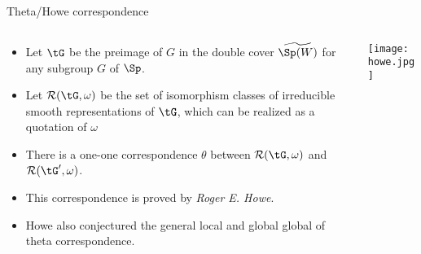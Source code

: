 \documentclass[final,hyperref={pdfpagelabels=false}]{beamer} %
\def\cR{{\mathcal{R}}}
\begin{document}
\begin{frame}
\begin{minipage}[t]{.48\linewidth}
    \begin{block}{Theta/Howe correspondence}
      \begin{columns}
        \begin{column}{0.7\textwidth}
      \begin{itemize}
        \item Let $\tG$ be the preimage of $G$ in the double cover 
          $\widetilde{\Sp(W)}$ for any subgroup $G$ of $\Sp$.
        \item Let $\cR(\tG,\omega)$ be the set of isomorphism classes 
          of irreducible smooth representations of $\tG$,
          which can be realized as a quotation of $\omega$ 
        \item There is a one-one correspondence $\theta$
          between $\cR(\tG,\omega)$ and $\cR(\tG',\omega)$.
        \item This correspondence is proved by {\em Roger E. Howe}.
        \item Howe also conjectured the general local and global global of theta correspondence.
      \end{itemize}
    \end{column}
    \begin{column}{0.26\textwidth}
      \texttt{[image: howe.jpg]}
    \end{column}
  \end{columns}
\end{block}


\end{minipage}
\end{frame}
\end{document}
